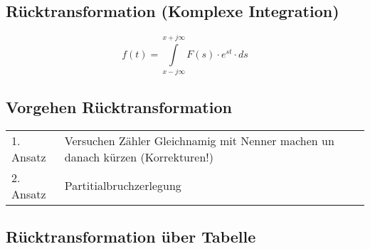 		\subsection{Rücktransformation (Komplexe Integration)}
			$$f(t)=\int\limits_{x-j\infty}^{x+j\infty}F(s) \cdot e^{st} \cdot ds$$
			
		\subsection{Vorgehen Rücktransformation}
		\begin{tabular}{ll}
  			1. Ansatz & Versuchen Zähler Gleichnamig mit Nenner machen un danach
  			kürzen (Korrekturen!) \\
  			2. Ansatz & Partitialbruchzerlegung
		\end{tabular}
			
		\newpage
		
		\subsection{Rücktransformation über Tabelle}
			\begin{center}
				
			\end{center}
			\vfill
		
				